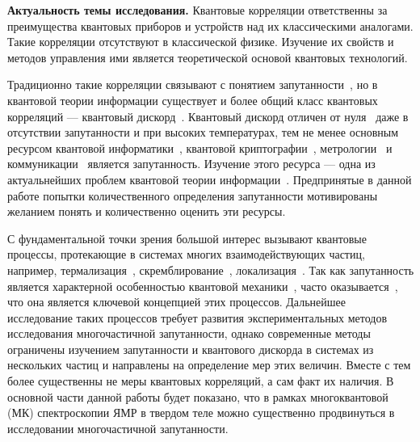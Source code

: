 
\textbf{Актуальность темы исследования.}
Квантовые корреляции ответственны за преимущества квантовых приборов и устройств над их классическими аналогами.
Такие корреляции отсутствуют в классической физике.
Изучение их свойств и методов управления ими является теоретической основой квантовых технологий.

Традиционно такие корреляции связывают с понятием запутанности~\cite{Einstein1935},
но в квантовой теории информации существует и более общий класс квантовых корреляций --- квантовый дискорд~\cite{Bera2017}.
Квантовый дискорд отличен от нуля~\cite{Yurishchev2011} даже в отсутствии запутанности и при высоких температурах,
тем не менее основным ресурсом
квантовой информатики~\cite{Arute2019},
квантовой криптографии~\cite{Gisin2002},
метрологии~\cite{Toth2012}
и коммуникации~\cite{Yin2017}
является запутанность.
Изучение этого ресурса --- одна из актуальнейших проблем квантовой теории информации~\cite{Nielsen2000}.
Предпринятые в данной работе попытки количественного определения запутанности мотивированы
желанием понять и количественно оценить эти ресурсы.


С фундаментальной точки зрения большой интерес вызывают квантовые процессы,
протекающие в системах многих взаимодействующих частиц,
например, термализация~\cite{DAlessio2016}, скремблирование~\cite{Hosur2016},  локализация~\cite{Alvarez2010}.
Так как запутанность является характерной особенностью квантовой механики~\cite{Schrodinger1935},
часто оказывается~\cite{Kaufman2016, Neill2016, Garttner2018},
что она является ключевой концепцией этих процессов.
Дальнейшее исследование таких процессов
требует развития экспериментальных методов исследования многочастичной запутанности,
однако современные методы~\cite{Horodecki2009} ограничены изучением запутанности
и квантового дискорда в системах из нескольких частиц
и направлены на определение мер этих величин.
Вместе с тем более существенны не меры квантовых корреляций,
а сам факт их наличия.
В основной части данной работы будет показано,
что в рамках многоквантовой (МК) спектроскопии ЯМР в твердом теле можно существенно продвинуться в исследовании многочастичной запутанности.


